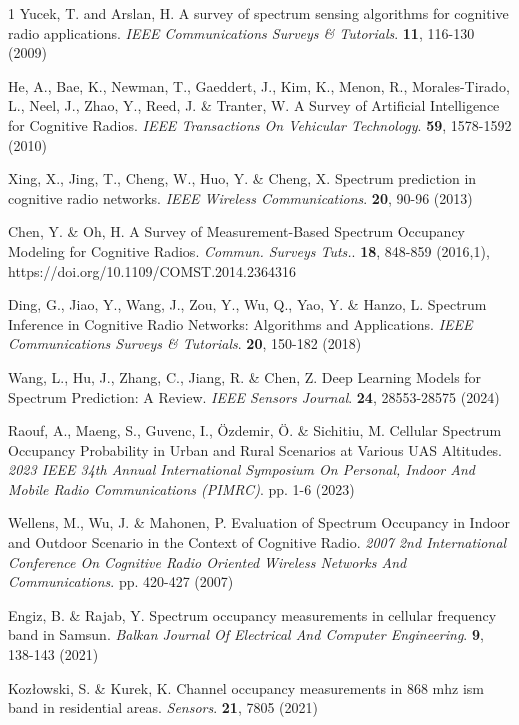 \documentclass[lettersize,journal]{IEEEtran}
\begin{document}
\begin{thebibliography}{1}
Yucek, T. and Arslan, H. A survey of spectrum sensing algorithms for cognitive radio applications. {\em IEEE Communications Surveys \& Tutorials}. \textbf{11}, 116-130 (2009)

He, A., Bae, K., Newman, T., Gaeddert, J., Kim, K., Menon, R., Morales-Tirado, L., Neel, J., Zhao, Y., Reed, J. \& Tranter, W. A Survey of Artificial Intelligence for Cognitive Radios. {\em IEEE Transactions On Vehicular Technology}. \textbf{59}, 1578-1592 (2010)

Xing, X., Jing, T., Cheng, W., Huo, Y. \& Cheng, X. Spectrum prediction in cognitive radio networks. {\em IEEE Wireless Communications}. \textbf{20}, 90-96 (2013)

Chen, Y. \& Oh, H. A Survey of Measurement-Based Spectrum Occupancy Modeling for Cognitive Radios. {\em Commun. Surveys Tuts.}. \textbf{18}, 848-859 (2016,1), https://doi.org/10.1109/COMST.2014.2364316

Ding, G., Jiao, Y., Wang, J., Zou, Y., Wu, Q., Yao, Y. \& Hanzo, L. Spectrum Inference in Cognitive Radio Networks: Algorithms and Applications. {\em IEEE Communications Surveys \& Tutorials}. \textbf{20}, 150-182 (2018)

Wang, L., Hu, J., Zhang, C., Jiang, R. \& Chen, Z. Deep Learning Models for Spectrum Prediction: A Review. {\em IEEE Sensors Journal}. \textbf{24}, 28553-28575 (2024)


Raouf, A., Maeng, S., Guvenc, I., {\"O}zdemir, {\"O}. \& Sichitiu, M. Cellular Spectrum Occupancy Probability in Urban and Rural Scenarios at Various UAS Altitudes. {\em 2023 IEEE 34th Annual International Symposium On Personal, Indoor And Mobile Radio Communications (PIMRC)}. pp. 1-6 (2023)

Wellens, M., Wu, J. \& Mahonen, P. Evaluation of Spectrum Occupancy in Indoor and Outdoor Scenario in the Context of Cognitive Radio. {\em 2007 2nd International Conference On Cognitive Radio Oriented Wireless Networks And Communications}. pp. 420-427 (2007)

Engiz, B. \& Rajab, Y. Spectrum occupancy measurements in cellular frequency band in Samsun. {\em Balkan Journal Of Electrical And Computer Engineering}. \textbf{9}, 138-143 (2021)

Koz{\l}owski, S. \& Kurek, K. Channel occupancy measurements in 868 mhz ism band in residential areas. {\em Sensors}. \textbf{21}, 7805 (2021)



\end{thebibliography}
\end{document}
